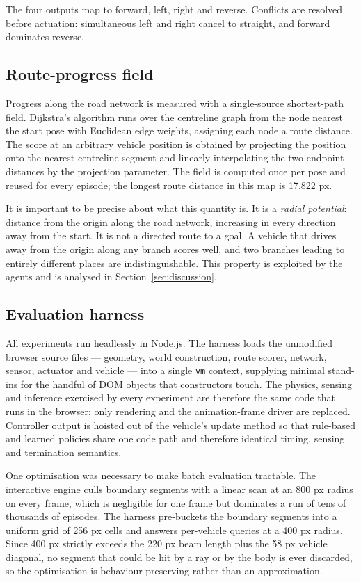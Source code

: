 \documentclass[conference]{IEEEtran}
\begin{document}
The four outputs map to forward, left, right and reverse. Conflicts are resolved before actuation: simultaneous left and right cancel to straight, and forward dominates reverse.

\subsection{Route-progress field}

Progress along the road network is measured with a single-source shortest-path field. Dijkstra's algorithm \cite{dijkstra} runs over the centreline graph from the node nearest the start pose with Euclidean edge weights, assigning each node a route distance. The score at an arbitrary vehicle position is obtained by projecting the position onto the nearest centreline segment and linearly interpolating the two endpoint distances by the projection parameter. The field is computed once per pose and reused for every episode; the longest route distance in this map is 17,822 px.

It is important to be precise about what this quantity is. It is a \emph{radial potential}: distance from the origin along the road network, increasing in every direction away from the start. It is not a directed route to a goal. A vehicle that drives away from the origin along any branch scores well, and two branches leading to entirely different places are indistinguishable. This property is exploited by the agents and is analysed in Section~\ref{sec:discussion}.

\subsection{Evaluation harness}

All experiments run headlessly in Node.js. The harness loads the unmodified browser source files — geometry, world construction, route scorer, network, sensor, actuator and vehicle — into a single \texttt{vm} context, supplying minimal stand-ins for the handful of DOM objects that constructors touch. The physics, sensing and inference exercised by every experiment are therefore the same code that runs in the browser; only rendering and the animation-frame driver are replaced. Controller output is hoisted out of the vehicle's update method so that rule-based and learned policies share one code path and therefore identical timing, sensing and termination semantics.

One optimisation was necessary to make batch evaluation tractable. The interactive engine culls boundary segments with a linear scan at an 800 px radius on every frame, which is negligible for one frame but dominates a run of tens of thousands of episodes. The harness pre-buckets the boundary segments into a uniform grid of 256 px cells and answers per-vehicle queries at a 400 px radius. Since 400 px strictly exceeds the 220 px beam length plus the 58 px vehicle diagonal, no segment that could be hit by a ray or by the body is ever discarded, so the optimisation is behaviour-preserving rather than an approximation.
\end{document}
